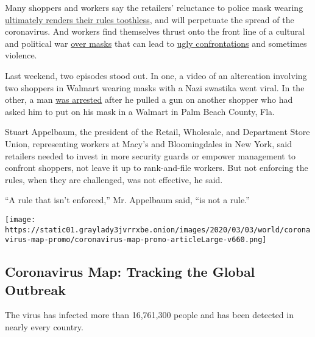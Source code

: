 Many shoppers and workers say the retailers' reluctance to police mask
wearing
\href{https://www.nytimes3xbfgragh.onion/2020/07/29/business/coronavirus-masks-stores-walmart.html}{ultimately
renders their rules toothless}, and will perpetuate the spread of the
coronavirus. And workers find themselves thrust onto the front line of a
cultural and political war
\href{https://www.nytimes3xbfgragh.onion/2020/05/03/us/coronavirus-masks-protests.html}{over
masks} that can lead to
\href{https://www.nytimes3xbfgragh.onion/2020/05/15/us/coronavirus-masks-violence.html?searchResultPosition=105}{ugly
confrontations} and sometimes violence.

Last weekend, two episodes stood out. In one, a video of an altercation
involving two shoppers in Walmart wearing masks with a Nazi swastika
went viral. In the other, a man
\href{https://www.facebookcorewwwi.onion/palmbeachcountysheriff/}{was
arrested} after he pulled a gun on another shopper who had asked him to
put on his mask in a Walmart in Palm Beach County, Fla.

Stuart Appelbaum, the president of the Retail, Wholesale, and Department
Store Union, representing workers at Macy's and Bloomingdales in New
York, said retailers needed to invest in more security guards or empower
management to confront shoppers, not leave it up to rank-and-file
workers. But not enforcing the rules, when they are challenged, was not
effective, he said.

``A rule that isn't enforced,'' Mr. Appelbaum said, ``is not a rule.''

\href{https://www.nytimes3xbfgragh.onion/interactive/2020/world/coronavirus-maps.html}{}

\texttt{[image: https://static01.graylady3jvrrxbe.onion/images/2020/03/03/world/coronavirus-map-promo/coronavirus-map-promo-articleLarge-v660.png]}

\hypertarget{coronavirus-map-tracking-the-global-outbreak}{%
\subsection{Coronavirus Map: Tracking the Global
Outbreak}\label{coronavirus-map-tracking-the-global-outbreak}}

The virus has infected more than 16,761,300 people and has been detected
in nearly every country.

\hypertarget{-4}{%
\subsection{}\label{-4}}

